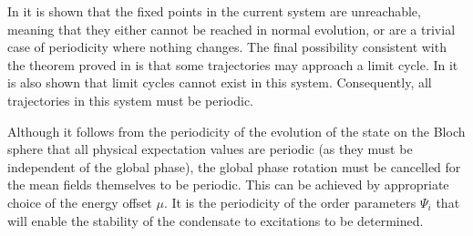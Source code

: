 In  it is shown that the fixed points in the current system are unreachable, meaning that they either cannot be reached in normal evolution, or are a trivial case of periodicity where nothing changes.  The final possibility consistent with the theorem proved in \citep{Schwartz:1963} is that some trajectories may approach a limit cycle.  In  it is also shown that limit cycles cannot exist in this system.  Consequently, all trajectories in this system must be periodic.

Although it follows from the periodicity of the evolution of the state on the Bloch sphere that all physical expectation values are periodic (as they must be independent of the global phase), the global phase rotation must be cancelled for the mean fields themselves to be periodic. This can be achieved by appropriate choice of the energy offset $\mu$. It is the periodicity of the order parameters $\Psi_i$ that will enable the stability of the condensate to excitations to be determined.

